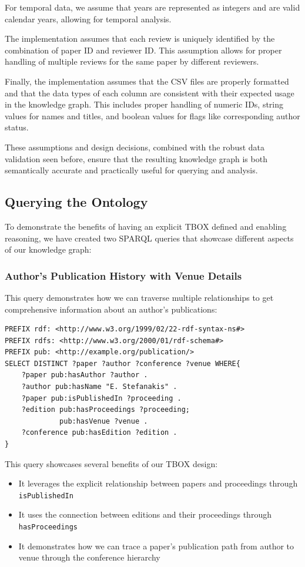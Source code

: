 \documentclass[10pt,a4paper]{article}
\begin{document}
For temporal data, we assume that years are represented as integers and are valid calendar years, allowing for temporal analysis.

The implementation assumes that each review is uniquely identified by the combination of paper ID and reviewer ID. This assumption allows for proper handling of multiple reviews for the same paper by different reviewers.

Finally, the implementation assumes that the CSV files are properly formatted and that the data types of each column are consistent with their expected usage in the knowledge graph. This includes proper handling of numeric IDs, string values for names and titles, and boolean values for flags like corresponding author status.

These assumptions and design decisions, combined with the robust data validation seen before, ensure that the resulting knowledge graph is both semantically accurate and practically useful for querying and analysis.

\subsection{Querying the Ontology}

To demonstrate the benefits of having an explicit TBOX defined and enabling reasoning, we have created two SPARQL queries that showcase different aspects of our knowledge graph:

\subsubsection{Author's Publication History with Venue Details}
This query demonstrates how we can traverse multiple relationships to get comprehensive information about an author's publications:

\begin{verbatim}
PREFIX rdf: <http://www.w3.org/1999/02/22-rdf-syntax-ns#>
PREFIX rdfs: <http://www.w3.org/2000/01/rdf-schema#>
PREFIX pub: <http://example.org/publication/>
SELECT DISTINCT ?paper ?author ?conference ?venue WHERE{
    ?paper pub:hasAuthor ?author .
    ?author pub:hasName "E. Stefanakis" .
    ?paper pub:isPublishedIn ?proceeding .
    ?edition pub:hasProceedings ?proceeding;
             pub:hasVenue ?venue .
    ?conference pub:hasEdition ?edition .
}
\end{verbatim}

\noindent
This query showcases several benefits of our TBOX design:
\begin{itemize}
    \item It leverages the explicit relationship between papers and proceedings through \texttt{isPublishedIn}
    \item It uses the connection between editions and their proceedings through \texttt{hasProceedings}
    \item It demonstrates how we can trace a paper's publication path from author to venue through the conference hierarchy
\end{itemize}
\end{document}
